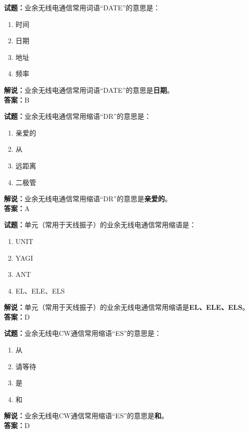 \documentclass{ctexbook}
\begin{document}
\bigskip


\noindent\textbf{试题：}业余无线电通信常用词语“DATE”的意思是：
\begin{enumerate}[leftmargin=3em]
\item 时间
\item 日期
\item 地址
\item 频率
\end{enumerate}
\noindent\textbf{解说：}业余无线电通信常用词语“DATE”的意思是\textbf{日期}。\\\noindent\textbf{答案：}B

\bigskip


\noindent\textbf{试题：}业余无线电通信常用缩语“DR”的意思是：
\begin{enumerate}[leftmargin=3em]
\item 亲爱的
\item 从
\item 远距离
\item 二极管
\end{enumerate}
\noindent\textbf{解说：}业余无线电通信常用缩语“DR”的意思是\textbf{亲爱的}。\\\noindent\textbf{答案：}A

\bigskip


\noindent\textbf{试题：}单元（常用于天线振子）的业余无线电通信常用缩语是：
\begin{enumerate}[leftmargin=3em]
\item UNIT
\item YAGI
\item ANT
\item EL、ELE、ELS
\end{enumerate}
\noindent\textbf{解说：}单元（常用于天线振子）的业余无线电通信常用缩语是\textbf{EL、ELE、ELS}。\\\noindent\textbf{答案：}D

\bigskip


\noindent\textbf{试题：}业余无线电CW通信常用缩语“ES”的意思是：
\begin{enumerate}[leftmargin=3em]
\item 从
\item 请等待
\item 是
\item 和
\end{enumerate}
\noindent\textbf{解说：}业余无线电CW通信常用缩语“ES”的意思是\textbf{和}。\\\noindent\textbf{答案：}D

\bigskip
\end{document}
